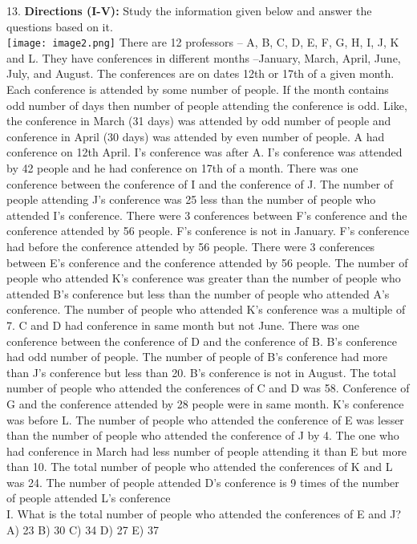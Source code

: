 \documentclass[
]{article}
\begin{document}
13. \textbf{Directions (I-V):} Study the information given below and answer the questions based on it.\\
\texttt{[image: image2.png]}
There are 12 professors – A, B, C, D, E, F, G, H, I, J, K and L. They have conferences in
different months –January, March, April, June, July, and August. The conferences are on
dates 12th or 17th of a given month. Each conference is attended by some number of people.
If the month contains odd number of days then number of people attending the conference
is odd. Like, the conference in March (31 days) was attended by odd number of people and
conference in April (30 days) was attended by even number of people. A had conference on
12th April. I’s conference was after A. I’s conference was attended by 42 people and he had
conference on 17th of a month. There was one conference between the conference of I and
the conference of J. The number of people attending J’s conference was 25 less than the
number of people who attended I’s conference. There were 3 conferences between F’s
conference and the conference attended by 56 people. F’s conference is not in January. F’s
conference had before the conference attended by 56 people. There were 3 conferences
between E’s conference and the conference attended by 56 people. The number of people
who attended K’s conference was greater than the number of people who attended B’s
conference but less than the number of people who attended A’s conference. The number of
people who attended K’s conference was a multiple of 7. C and D had conference in same
month but not June. There was one conference between the conference of D and the
conference of B. B’s conference had odd number of people. The number of people of B’s
conference had more than J’s conference but less than 20. B’s conference is not in August.
The total number of people who attended the conferences of C and D was 58. Conference of
G and the conference attended by 28 people were in same month. K’s conference was before
L. The number of people who attended the conference of E was lesser than the number of
people who attended the conference of J by 4. The one who had conference in March had
less number of people attending it than E but more than 10. The total number of people who
attended the conferences of K and L was 24. The number of people attended D’s conference
is 9 times of the number of people attended L’s conference\\

I. What is the total number of people who attended the conferences of E and J?\\
A) 23 \hspace{2mm}B) 30 \hspace{2mm}C) 34 \hspace{2mm}D) 27 \hspace{2mm}E) 37\\
\end{document}
